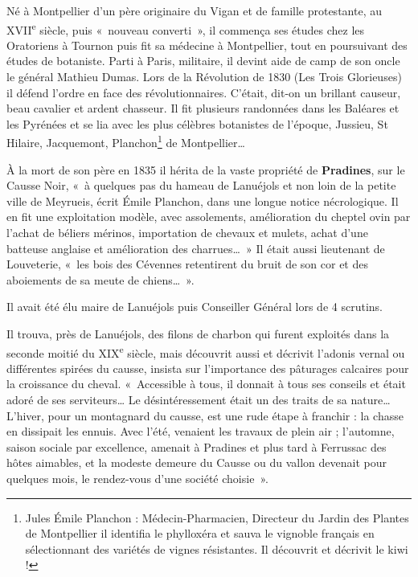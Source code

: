 Né à Montpellier d’un père originaire du Vigan et de famille protestante, au XVII\textsuperscript{e} siècle, puis «~nouveau converti~», il commença ses études chez les Oratoriens à Tournon puis fit sa médecine à Montpellier,
tout en poursuivant des études de botaniste.
Parti à Paris, militaire, il devint aide de camp de son oncle le général Mathieu Dumas. Lors de la
Révolution de 1830 (Les Trois Glorieuses) il défend l’ordre en face des révolutionnaires. C’était, dit-on un brillant causeur, beau cavalier et ardent chasseur.
Il fit plusieurs randonnées dans les Baléares et les Pyrénées et se lia avec les plus célèbres botanistes
de l’époque, Jussieu, St Hilaire, Jacquemont, Planchon\footnote{Jules Émile Planchon : Médecin-Pharmacien, Directeur du Jardin des Plantes de Montpellier il identifia le phylloxéra et sauva le vignoble français en sélectionnant des variétés de vignes résistantes. Il découvrit et décrivit le kiwi !} de Montpellier…

À la mort de son père en 1835 il hérita de la vaste propriété de \textbf{Pradines}, sur le Causse Noir, «~à
quelques pas du hameau de Lanuéjols et non loin de la petite ville de Meyrueis, écrit Émile Planchon,
dans une longue notice nécrologique. Il en fit une exploitation modèle, avec assolements,
amélioration du cheptel ovin par l’achat de béliers mérinos, importation de chevaux et mulets, achat
d’une batteuse anglaise et amélioration des charrues…~»
Il était aussi lieutenant de Louveterie, «~les bois des Cévennes retentirent du bruit de son cor et des
aboiements de sa meute de chiens…~».

Il avait été élu maire de Lanuéjols puis Conseiller Général lors de 4 scrutins.

Il trouva, près de Lanuéjols, des filons de charbon qui furent exploités dans la seconde moitié du XIX\textsuperscript{e} siècle,
mais découvrit aussi et décrivit l’adonis vernal ou différentes spirées du causse, insista sur
l’importance des pâturages calcaires pour la croissance du cheval.
«~Accessible à tous, il donnait à tous ses conseils et était adoré de ses serviteurs… Le
désintéressement était un des traits de sa nature… L’hiver, pour un montagnard du causse, est une
rude étape à franchir : la chasse en dissipait les ennuis. Avec l’été, venaient les travaux de plein air ;
l’automne, saison sociale par excellence, amenait à Pradines et plus tard à Ferrussac des hôtes
aimables, et la modeste demeure du Causse ou du vallon devenait pour quelques mois, le rendez-vous
d’une société choisie~».

